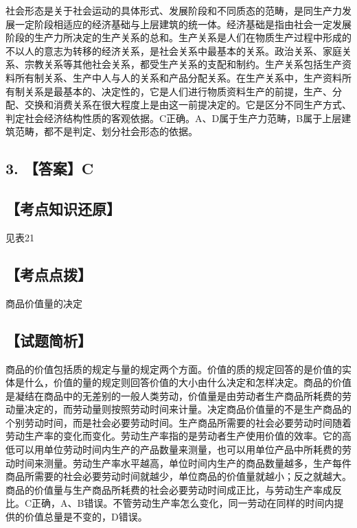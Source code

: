 \documentclass[UTF8,11pt]{ctexart}
\begin{document}
社会形态是关于社会运动的具体形式、发展阶段和不同质态的范畴，是同生产力发展一定阶段相适应的经济基础与上层建筑的统一体。经济基础是指由社会一定发展阶段的生产力所决定的生产关系的总和。生产关系是人们在物质生产过程中形成的不以人的意志为转移的经济关系，是社会关系中最基本的关系。政治关系、家庭关系、宗教关系等其他社会关系，都受生产关系的支配和制约。生产关系包括生产资料所有制关系、生产中人与人的关系和产品分配关系。在生产关系中，生产资料所有制关系是最基本的、决定性的，它是人们进行物质资料生产的前提，生产、分配、交换和消费关系在很大程度上是由这一前提决定的。它是区分不同生产方式、判定社会经济结构性质的客观依据。C正确。A、D属于生产力范畴，B属于上层建筑范畴，都不是判定、划分社会形态的依据。


\subsection*{3. 【答案】C}

\subsection*{【考点知识还原】}

见表21


\subsection*{【考点点拨】}

商品价值量的决定


\subsection*{【试题简析】}

商品的价值包括质的规定与量的规定两个方面。价值的质的规定回答的是价值的实体是什么，价值的量的规定则回答价值的大小由什么决定和怎样决定。商品的价值是凝结在商品中的无差别的一般人类劳动，价值量是由劳动者生产商品所耗费的劳动量决定的，而劳动量则按照劳动时间来计量。决定商品价值量的不是生产商品的个别劳动时间，而是社会必要劳动时间。生产商品所需要的社会必要劳动时间随着劳动生产率的变化而变化。劳动生产率指的是劳动者生产使用价值的效率。它的高低可以用单位劳动时间内生产的产品数量来测量，也可以用单位产品中所耗费的劳动时间来测量。劳动生产率水平越高，单位时间内生产的商品数量越多，生产每件商品所需要的社会必要劳动时间就越少，单位商品的价值量就越小；反之就越大。商品的价值量与生产商品所耗费的社会必要劳动时间成正比，与劳动生产率成反比。C正确，A、B错误。不管劳动生产率怎么变化，同一劳动在同样的时间内提供的价值总量是不变的，D错误。
\end{document}
